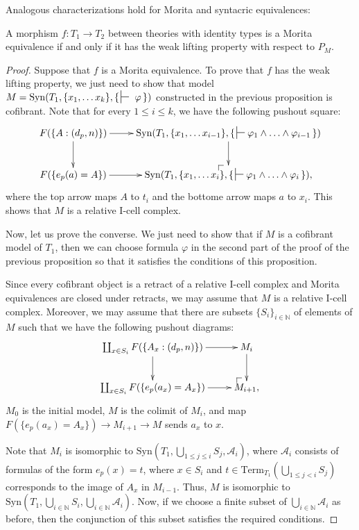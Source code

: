 \documentclass[reqno]{amsart}
\makeatletter
\theoremstyle{definition}
\theoremstyle{remark}
\newcommand{\Syn}{\mathrm{Syn}}
\newcommand{\Term}{\mathrm{Term}}
\newcommand{\I}{\mathrm{I}}
\numberwithin{figure}{section}
\newcommand{\po}[1][dr]{\save*!/#1+1.2pc/#1:(1,-1)@^{|-}\restore}
\makeatother
\begin{document}
Analogous characterizations hold for Morita and syntacric equivalences:

\begin{prop}
A morphism $f : T_1 \to T_2$ between theories with identity types is a Morita equivalence if and only if it has the weak lifting property with respect to $P_M$.
\end{prop}
\begin{proof}
Suppose that $f$ is a Morita equivalence.
To prove that $f$ has the weak lifting property, we just need to show that model $M = \Syn(T_1, \{ x_1, \ldots x_k \}, \{\,\sststile{}{}~\varphi\,\})$
constructed in the previous proposition is cofibrant.
Note that for every $1 \leq i \leq k$, we have the following pushout square:
\[ \xymatrix{ F(\{ A : (d_p,n) \}) \ar[d] \ar[r] &     \Syn(T_1, \{ x_1, \ldots x_{i-1} \}, \{\,\sststile{}{} \varphi_1 \land \ldots \land \varphi_{i-1} \,\}) \ar[d] \\
              F(\{ e_p(a) = A \})         \ar[r] & \po \Syn(T_1, \{ x_1, \ldots x_i \}, \{\,\sststile{}{} \varphi_1 \land \ldots \land \varphi_i \,\}),
            } \]
where the top arrow maps $A$ to $t_i$ and the bottome arrow maps $a$ to $x_i$.
This shows that $M$ is a relative $\I$-cell complex.

Now, let us prove the converse.
We just need to show that if $M$ is a cofibrant model of $T_1$, then we can choose formula $\varphi$
in the second part of the proof of the previous proposition so that it satisfies the conditions of this proposition.

Since every cofibrant object is a retract of a relative $\I$-cell complex and Morita equivalences are closed under retracts, we may assume that $M$ is a relative $\I$-cell complex.
Moreover, we may assume that there are subsets $\{S_i\}_{i \in \mathbb{N}}$ of elements of $M$ such that we have the following pushout diagrams:
\[ \xymatrix{ \coprod_{x \in S_i} F(\{ A_x : (d_p,n) \}) \ar[d] \ar[r] &     M_i \ar[d] \\
              \coprod_{x \in S_i} F(\{ e_p(a_x) = A_x \})       \ar[r] & \po M_{i+1},
            } \]
$M_0$ is the initial model, $M$ is the colimit of $M_i$, and map $F(\{ e_p(a_x) = A_x \}) \to M_{i+1} \to M$ sends $a_x$ to $x$.

Note that $M_i$ is isomorphic to $\Syn(T_1, \bigcup_{1 \leq j \leq i} S_j, \mathcal{A}_i)$,
where $\mathcal{A}_i$ consists of formulas of the form $e_p(x) = t$, where $x \in S_i$ and $t \in \Term_{T_1}(\bigcup_{1 \leq j < i} S_j)$ corresponds to the image of $A_x$ in $M_{i-1}$.
Thus, $M$ is isomorphic to $\Syn(T_1, \bigcup_{i \in \mathbb{N}} S_i, \bigcup_{i \in \mathbb{N}} \mathcal{A}_i)$.
Now, if we choose a finite subset of $\bigcup_{i \in \mathbb{N}} \mathcal{A}_i$ as before, then the conjunction of this subset satisfies the required conditions.
\end{proof}
\end{document}
